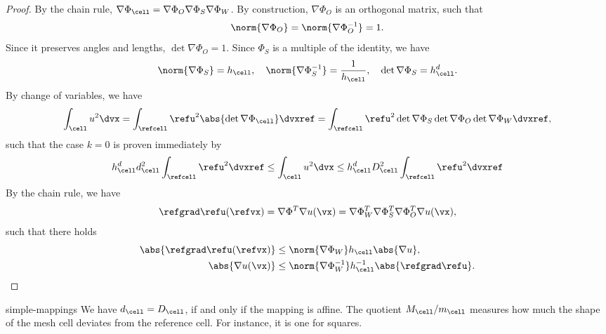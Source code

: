 \begin{proof}
  By the chain rule,
  $\nabla \Phi_{\cell} = \nabla \Phi_O \nabla \Phi_S \nabla \Phi_W$. By
  construction, $\nabla\Phi_O$ is an orthogonal matrix, such that
  \begin{gather*}
    \norm{\nabla\Phi_O} = \norm{\nabla\Phi_O^{-1}} = 1.
  \end{gather*}
  Since it preserves angles and lengths, $\det \nabla\Phi_O =
  1$. Since $\Phi_S$ is a multiple of the identity, we have
  \begin{gather*}
    \norm{\nabla\Phi_S} = h_\cell,
    \quad\norm{\nabla\Phi_S^{-1}} = \frac1{h_\cell},
    \quad\det\nabla\Phi_S = h_\cell^d.
  \end{gather*}
  By change of variables, we have
  \begin{gather*}
    \int_\cell u^2 \dvx
    = \int_{\refcell} \refu^2 \abs{\det\nabla\Phi_\cell} \dvxref
    = \int_{\refcell} \refu^2 \det\nabla\Phi_S\det\nabla\Phi_O\det\nabla\Phi_W \dvxref
    ,
  \end{gather*}
  such that the case $k=0$ is proven immediately by
  \begin{gather*}
    h_{\cell}^d d_\cell^2 \int_{\refcell} \refu^2 \dvxref
    \le \int_\cell u^2 \dvx
    \le h_{\cell}^d D_\cell^2 \int_{\refcell} \refu^2 \dvxref
  \end{gather*}
  By the chain rule, we have
  \begin{gather*}
    \refgrad\refu(\refvx) = \nabla\Phi^T \nabla u(\vx)
    = \nabla\Phi_W^T \nabla\Phi_S^T \nabla\Phi_O^T \nabla u(\vx),
  \end{gather*}
  such that there holds
  \begin{gather}
    \begin{split}
      \abs{\refgrad\refu(\refvx)}
      &\le \norm{\nabla\Phi_W} h_\cell \abs{\nabla u},\\
      \abs{\nabla u(\vx)}
      &\le \norm{\nabla\Phi_W^{-1}} h_\cell^{-1} \abs{\refgrad \refu}.
    \end{split}
  \end{gather}
\end{proof}


\begin{Remark}{simple-mappings}
  We have $d_\cell = D_\cell$, if and only if the mapping is
  affine. The quotient $M_\cell/m_\cell$ measures how much the shape
  of the mesh cell deviates from the reference cell. For instance, it
  is one for squares.
\end{Remark}

